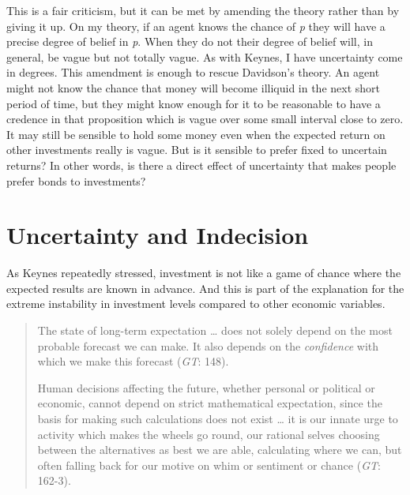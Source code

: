 \documentclass[
  11pt,
  letterpaper,
  DIV=11,
  numbers=noendperiod,
  twoside]{scrartcl}
\begin{document}
This is a fair criticism, but it can be met by amending the theory
rather than by giving it up. On my theory, if an agent knows the chance
of \emph{p} they will have a precise degree of belief in \emph{p}. When
they do not their degree of belief will, in general, be vague but not
totally vague. As with Keynes, I have uncertainty come in degrees. This
amendment is enough to rescue Davidson's theory. An agent might not know
the chance that money will become illiquid in the next short period of
time, but they might know enough for it to be reasonable to have a
credence in that proposition which is vague over some small interval
close to zero. It may still be sensible to hold some money even when the
expected return on other investments really is vague. But is it sensible
to prefer fixed to uncertain returns? In other words, is there a direct
effect of uncertainty that makes people prefer bonds to investments?

\section{Uncertainty and Indecision}\label{uncertainty-and-indecision}

As Keynes repeatedly stressed, investment is not like a game of chance
where the expected results are known in advance. And this is part of the
explanation for the extreme instability in investment levels compared to
other economic variables.

\begin{quote}
The state of long-term expectation \ldots{} does not solely depend on
the most probable forecast we can make. It also depends on the
\emph{confidence} with which we make this forecast (\emph{GT}: 148).

Human decisions affecting the future, whether personal or political or
economic, cannot depend on strict mathematical expectation, since the
basis for making such calculations does not exist \ldots{} it is our
innate urge to activity which makes the wheels go round, our rational
selves choosing between the alternatives as best we are able,
calculating where we can, but often falling back for our motive on whim
or sentiment or chance (\emph{GT}: 162-3).
\end{quote}
\end{document}
